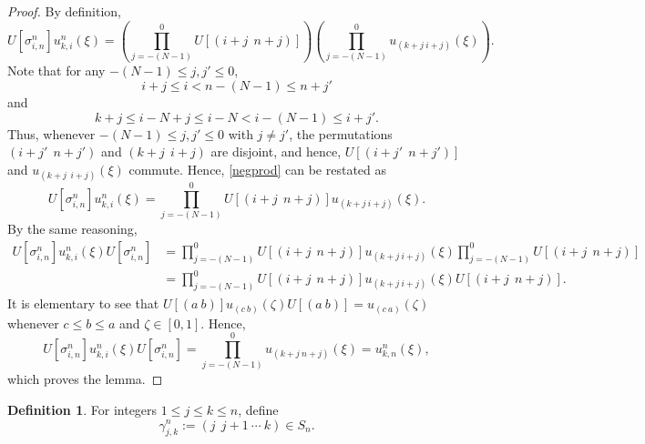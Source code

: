 \documentclass[12pt]{amsart}
\numberwithin{equation}{section}
\theoremstyle{definition}
\newtheorem{definition}[theorem]{Definition}
\theoremstyle{remark}
\begin{document}
\begin{proof}
	By definition,
	\begin{equation}
	\label{negprod}
	U[\sigma^{n}_{i,n}]u^{n}_{k,i}(\xi)
	=\left(\prod_{j=-(N-1)}^{0}U[(i+j \ \ n+j)]\right)\left(\prod_{j=-(N-1)}^{0}u_{(k+j \  i+j)}(\xi)\right).
	\end{equation}
	Note that for any $-(N-1)\leq j,j'\leq 0$, 
	$$
	i+j\leq i<n-(N-1)\leq n+j'
	$$
	and 
	$$
	k+j\leq i-N+j\leq i-N<i-(N-1)\leq i+j'.
	$$
	Thus, whenever $-(N-1)\leq j,j'\leq 0$ with $j\not=j'$, the permutations $(i +j' \ \ n+j')$ and $(k+j \ \ i+j)$ are disjoint, and hence, $U[(i +j' \ \ n+j')]$ and $u_{(k+j \ \  i+j)}(\xi)$ commute. Hence, \autoref{negprod} can be restated as
	$$
	U[\sigma^{n}_{i,n}]u^{n}_{k,i}(\xi)=\prod_{j=-(N-1)}^{0}U[(i+j \ \ n+j)]u_{(k+j \  i+j)}(\xi).
	$$
	By the same reasoning,
	$$
	\begin{aligned}
	U[\sigma^{n}_{i,n}]u^{n}_{k,i}(\xi)U[\sigma^{n}_{i,n}]
	&=\prod_{j=-(N-1)}^{0}U[(i+j \ \ n+j)]u_{(k+j \  i+j)}(\xi)\prod_{j=-(N-1)}^{0}U[(i+j \ \ n+j)]\\
	&=\prod_{j=-(N-1)}^{0}U[(i+j \ \ n+j)]u_{(k+j \  i+j)}(\xi)U[(i+j \ \ n+j)].
	\end{aligned}
	$$
	It is elementary to see that $U[(a \ b)]u_{(c \ b)}(\zeta)U[(a \ b)]=u_{(c \ a)}(\zeta)$ whenever $c\leq b\leq a$ and $\zeta\in[0,1]$. Hence,
	$$
	U[\sigma^{n}_{i,n}]u^{n}_{k,i}(\xi)U[\sigma^{n}_{i,n}]
	=\prod_{j=-(N-1)}^{0}u_{(k+j \ n+j)}(\xi)=u^{n}_{k,n}(\xi),
	$$
	which proves the lemma.
\end{proof}

\begin{definition}
	For integers $1\leq j\leq k\leq n$, define 
	$$
	\gamma^{n}_{j,k}:=(j \ \ j+1 \ \cdots \ k)\in S_{n}.
	$$
\end{definition}
\end{document}
